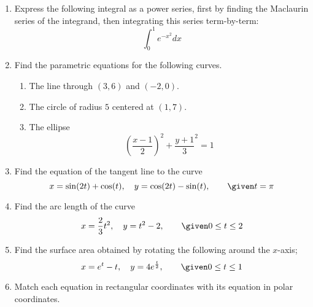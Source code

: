 \begin{enumerate}
  \item Express the following integral as a power series, first by finding the
    Maclaurin series of the integrand, then integrating this series
    term-by-term:
    \[%
    \int_{0}^{1} e^{-x^2}  dx
    \]%

\newpage %

  \item Find the parametric equations for the following curves.
    \begin{enumerate}[itemsep=16em]
      \item The line through \((3,6)\) and \((-2, 0)\).

      \item The circle of radius \(5\) centered at \((1,7)\).

      \item The ellipse
        \[%
          \left( \frac{x-1}{2} \right)^2 + \frac{y+1}{3}^2 = 1
        \]%
    \end{enumerate}

\newpage %

  \item Find the equation of the tangent line to the curve
    \[%
    x = \sin (2t) + \cos (t), \quad y = \cos (2t) - \sin (t), \qquad \given t
    = \pi
    \]%

\newpage %

\item Find the arc length of the curve
  \[%
  x = \frac{2}{3}t^2, \quad y = t^2 - 2, \qquad \given 0 \leq t \leq 2
  \]%


\newpage %

  \item Find the surface area obtained by rotating the following around the
    \(x\)-axis;
    \[%
    x = e^t - t, \quad y = 4e^{\frac{t}{2}}, \qquad \given 0 \leq t \leq 1
    \]%


\newpage %

  \item Match each equation in rectangular coordinates with its equation in
    polar coordinates.


\end{enumerate}
